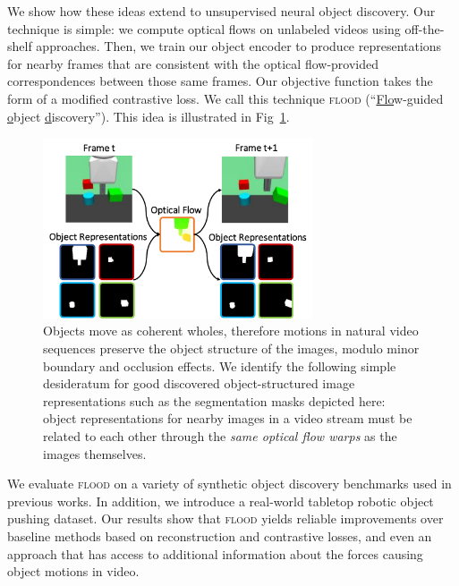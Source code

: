 \documentclass{article}
\begin{document}
We show how these ideas extend to unsupervised neural object discovery. Our technique is simple: we compute optical flows on unlabeled videos using off-the-shelf approaches. Then, we train our object encoder to produce representations for nearby frames that are consistent with the optical flow-provided correspondences between those same frames. Our objective function takes the form of a modified contrastive loss. We call this technique \textsc{flood} (``\ul{Flo}w-guided \ul{o}bject \ul{d}iscovery''). This idea is illustrated in Fig~\ref{fig:desired_property}.

\begin{figure}
    \centering
    \includegraphics[width=8cm]{figs/flood_main_figure.pdf}
    \caption{Objects move as coherent wholes, therefore motions in natural video sequences preserve the object structure of the images, modulo minor boundary and occlusion effects. We identify the following simple desideratum for good discovered object-structured image representations such as the segmentation masks depicted here: object representations for nearby images in a video stream must be related to each other through the \emph{same optical flow warps} as the images themselves.}
    \label{fig:desired_property}
\end{figure}

We evaluate \textsc{flood} on a variety of synthetic object discovery benchmarks used in previous works. In addition, we introduce a real-world tabletop robotic object pushing dataset. Our results show that \textsc{flood} yields reliable improvements over baseline methods based on reconstruction and contrastive losses, and even an approach that has access to additional information about the forces causing object motions in video.
\end{document}
